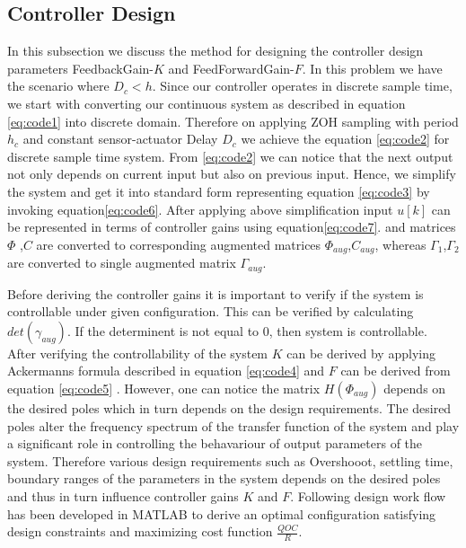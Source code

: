 \subsection{Controller Design}
In this subsection we discuss the method for designing the controller design parameters FeedbackGain-$K$ and FeedForwardGain-$F$. In this problem we have the scenario where $D_c<h$. Since our controller operates in discrete sample time, we start with converting our continuous system as described in equation \ref{eq:code1} into discrete domain. Therefore on applying ZOH sampling with period $h_c$ and constant sensor-actuator Delay $D_c$ we achieve the equation \ref{eq:code2} for discrete sample time system. From \ref{eq:code2} we can notice that the next output not only depends on current input but also on previous input. Hence, we simplify the system and get it into standard form representing equation \ref{eq:code3} by invoking equation\ref{eq:code6}. After applying above simplification input $u[k]$ can be represented in terms of controller gains using equation\ref{eq:code7}. 
and matrices $\Phi$ ,$C$ are converted to corresponding augmented matrices $\Phi_{aug}$,$C_{aug}$, whereas $\Gamma_1$,$\Gamma_2$ are converted to single augmented matrix $\Gamma_{aug}$.

  Before deriving the controller gains it is important to verify if the system is controllable under given configuration. This can be verified by calculating $det(\gamma_{aug})$. If the determinent is not equal to 0, then system is controllable. After verifying the controllability of the system $K$ can be derived by applying Ackermanns formula described in equation \ref{eq:code4} and $F$ can be derived from equation \ref{eq:code5} . However, one can notice the matrix $H(\Phi_{aug})$ depends on the desired poles which in turn depends on the design requirements. The desired poles alter the frequency spectrum of the transfer function of the system and play a significant role in controlling the behavariour of output parameters of the system. Therefore various design requirements such as Overshooot, settling time, boundary ranges of the parameters in the system depends on the desired poles and thus in turn influence controller gains $K$ and $F$. Following design work flow has been developed in MATLAB to derive an optimal configuration satisfying design constraints and maximizing cost function $\frac{QOC}{R}$.